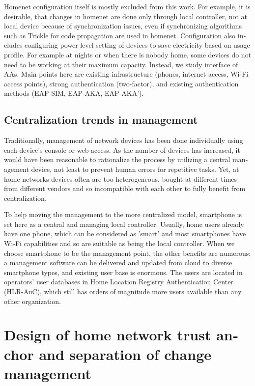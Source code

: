 \documentclass[12pt,a4paper,english]{tutthesis}
\begin{document}
\begin{otherlanguage}{english}
Homenet configuration itself is mostly excluded from this work.
For example, 
it is desirable, that changes in homenet are done only through
local controller, not at local device because of
synchronization issues, even 
if synchronizing algorithms such as Trickle  \cite{rfc6206}
for code propagation are used in homenet.
Configuration also includes configuring power level setting of devices to save electricity
based on usage profile. For example at nights or when there is nobody
home, some devices do not need to be working at their maximum
capacity. Instead, we study interface of AAs.
Main points here are existing infrastructure (phones, internet access, Wi-Fi
access points), strong authentication (two-factor), and existing
authentication methods (EAP-SIM, EAP-AKA, EAP-AKA').
\section{Centralization trends in management}
\label{sec-3-2}

Traditionally, management of network devices has been done
individually using each device's console or web-access.  As the number of
devices has increased, it would have been reasonable to rationalize
the process by utilizing a central management device, not least to prevent human
errors for repetitive tasks.  Yet, at home networks devices often are
too heterogeneous, bought at different times from different vendors
and so incompatible with each other to fully benefit from
centralization. 

To help moving the management to the more centralized
model, smartphone is set here as a central and managing local
controller.
Usually, home users already have one phone, which can be considered as
'smart' and most smartphones have Wi-Fi capabilities and so are
suitable as being the local controller.
When we choose smartphone to be the management point, the other benefits are
numerous:  a management software can be delivered and
updated from cloud to diverse smartphone types, and existing user
base is enormous. The users are located in operators' user databases
in Home Location Registry Authentication Center (HLR-AuC), which still has orders of
magnitude more users available than any other organization. 



\chapter{Design of home network trust anchor and separation of change management}
\label{sec-4}





\end{otherlanguage}
\end{document}
